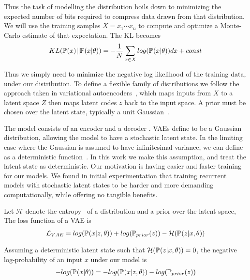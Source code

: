 \documentclass[../main.tex]{subfiles}
\begin{document}
Thus the task of modelling the distribution boils down to minimizing the expected number of bits required to compress data drawn from that distribution. We will use the training samples $X={x_1 \cdots x_n}$ to compute and optimize a Monte-Carlo estimate of that expectation. The KL becomes 
\begin{equation}
    \label{eq:mc_kl}
    KL(\pdf[]{x} || \pdf{x|\theta}) = - \frac{1}{N} \sum_{x \in X} log{(\pdf{x|\theta})} dx + const
\end{equation}{}

Thus we simply need to minimize the negative log likelihood of the training data, under our distribution. To define a flexible family of distributions we follow the approach taken in variational autoencoders~\citep{kingma2013auto}, which maps inputs from $X$ to a latent space $Z$ then maps latent codes $z$ back to the input space. A prior must be chosen over the latent state, typically a unit Gaussian~\citep{kingma2013auto}.

 The model consists of an encoder  and a decoder . VAEs define  to be a Gaussian distribution, allowing the model to have a stochastic latent state. In the limiting case where the Gaussian is assumed to have infinitesimal variance, we can define  as a deterministic function~\cite{kingma2019introduction}. In this work we make this assumption, and treat the latent state as deterministic. Our motivation is having easier and faster training for our models. We found in initial experimentation that training recurrent models with stochastic latent states to be harder and more demanding computationally, while offering no tangible benefits.  

Let $\mathcal{H}$ denote the entropy~\citep{shannon1948mathematical} of a distribution and  a prior over the latent space, The loss function of a VAE\citep{kingma2013auto} is 
\begin{equation}
    \mathcal{L}_{VAE} = log(\pdf{x|z,\theta}) + log(\pdf[prior]{z}) - \mathcal{H}(\pdf{z|x, \theta})
\end{equation}{}

Assuming a deterministic latent state such that $\mathcal{H}(\pdf{z|x, \theta}) = 0$, the negative log-probability of an input $x$ under our model is
\begin{equation}
    \label{eq:logprob}
    -log(\pdf{x|\theta}) = -log(\pdf{x|z,\theta}) - log(\pdf[prior]{z})
\end{equation}{}
\end{document}
